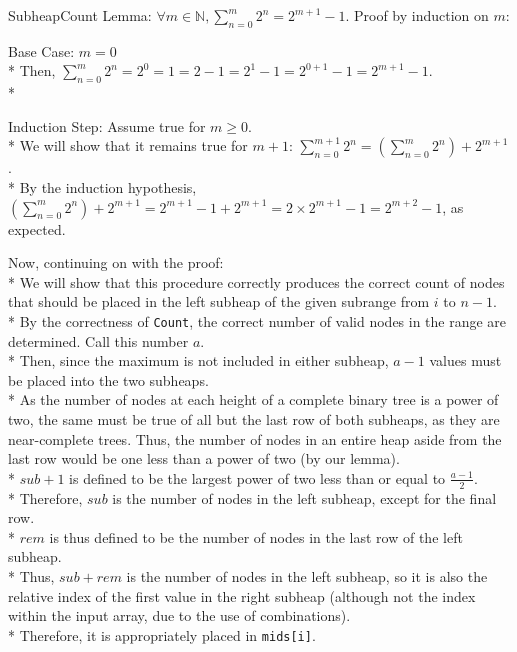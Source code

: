 \documentclass[letterpaper, reqno, 11pt]{article}
\newcommand{\NN}{\mathbb{N}}
\begin{document}
\begin{description}
	\item{SubheapCount}
	Lemma: $\forall m\in\NN, \sum_{n=0}^m2^n=2^{m+1}-1$.
	Proof by induction on $m$:
	\begin{description}
		\item{Base Case:} $m=0$\\*
		Then, $\sum_{n=0}^m2^n=2^0=1=2-1=2^{1}-1=2^{0+1}-1=2^{m+1}-1$.\\*
		\item{Induction Step:} Assume true for $m\geq0$.\\*
		We will show that it remains true for $m+1$:
		$\sum_{n=0}^{m+1}2^n=\left(\sum_{n=0}^{m}2^n\right)+2^{m+1}$.\\*
		By the induction hypothesis,
		$\left(\sum_{n=0}^{m}2^n\right)+2^{m+1}=2^{m+1}-1+2^{m+1}=2\times2^{m+1}-1=2^{m+2}-1$,
		as expected.
	\end{description}
	Now, continuing on with the proof:\\*
	We will show that this procedure correctly produces the correct count
	of nodes that should be placed in the left subheap of the given subrange from $i$ to $n-1$.\\*
	By the correctness of \verb|Count|, the correct number of valid nodes in the range are determined.
	Call this number $a$.\\*
	Then, since the maximum is not included in either subheap, $a-1$ values must be placed into the
	two subheaps.\\*
	As the number of nodes at each height of a complete binary tree is a power of two, the same must be
	true of all but the last row of both subheaps, as they are near-complete trees.
	Thus, the number of nodes in an entire heap aside from the last row would be
	one less than a power of two (by our lemma).\\*
	$sub+1$ is defined to be the largest power of two less than or equal to $\frac{a-1}{2}$.\\*
	Therefore, $sub$ is the number of nodes in the left subheap, except for the final row.\\*
	$rem$ is thus defined to be the number of nodes in the last row of the left subheap.\\*
	Thus, $sub+rem$ is the number of nodes in the left subheap, so it is also the relative index
	of the first value in the right subheap (although not the index within the input array, due
	to the use of combinations).\\*
	Therefore, it is appropriately placed in \verb|mids[i]|.


\end{description}
\end{document}
